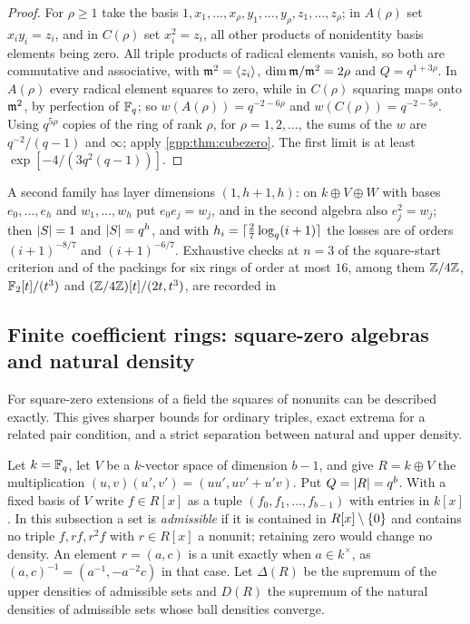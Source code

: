 \begin{proof}
For $\rho\ge1$ take the basis $1,x_1,\dots,x_\rho,y_1,\dots,y_\rho,z_1,\dots,z_\rho$; in
$A(\rho)$ set $x_iy_i=z_i$, and in $C(\rho)$ set $x_i^2=z_i$, all other products of
nonidentity basis elements being zero. All triple products of radical elements vanish, so
both are commutative and associative, with $\mathfrak{m}^2=\langle z_i\rangle$,
$\dim\mathfrak{m}/\mathfrak{m}^2=2\rho$ and $Q=q^{1+3\rho}$. In $A(\rho)$ every radical element squares to
zero, while in $C(\rho)$ squaring maps onto $\mathfrak{m}^2$, by perfection of $\mathbb{F}_q$; so
$w(A(\rho))=q^{-2-6\rho}$ and $w(C(\rho))=q^{-2-5\rho}$. Using $q^{5\rho}$ copies of the
ring of rank $\rho$, for $\rho=1,2,\dots$, the sums of the $w$ are $q^{-2}/(q-1)$ and
$\infty$; apply \cref{gpp:thm:cubezero}. The first limit is at least
$\exp[-4/(3q^2(q-1))]$.
\end{proof}

A second family has layer dimensions $(1,h+1,h)$: on $k\oplus V\oplus W$ with bases
$e_0,\dots,e_h$ and $w_1,\dots,w_h$ put $e_0e_j=w_j$, and in the second algebra also
$e_j^2=w_j$; then $\lvert S\rvert=1$ and $\lvert S\rvert=q^h$, and with $h_i=\lceil\tfrac27\log_q(i+1)\rceil$ the
losses are of orders $(i+1)^{-8/7}$ and $(i+1)^{-6/7}$. Exhaustive checks at $n=3$ of the
square-start criterion and of the packings for six rings of order at most $16$, among them
$\mathbb{Z}/4\mathbb{Z}$, $\mathbb{F}_2[t]/(t^3)$ and $(\mathbb{Z}/4\mathbb{Z})[t]/(2t,t^3)$, are recorded in

\subsection{Finite coefficient rings: square-zero algebras and natural density}\label{gpp:sec:squarezero}
{\raggedright{}}

For square-zero extensions of a field the squares of nonunits can be described exactly.
This gives sharper bounds for ordinary triples, exact extrema for a related pair
condition, and a strict separation between natural and upper density.

Let $k=\mathbb{F}_q$, let $V$ be a $k$-vector space of dimension $b-1$, and give $R=k\oplus V$ the
multiplication $(u,v)(u',v')=(uu',uv'+u'v)$. Put $Q=\lvert R\rvert=q^b$. With a fixed basis of
$V$ write $f\in R[x]$ as a tuple $(f_0,f_1,\ldots,f_{b-1})$ with entries in $k[x]$. In
this subsection a set is \emph{admissible} if it is contained in $R[x]\setminus\{0\}$
and contains no triple $f,rf,r^2f$ with $r\in R[x]$ a nonunit; retaining zero would
change no density. An element $r=(a,c)$ is a unit exactly when $a\in k^\times$, as
$(a,c)^{-1}=(a^{-1},-a^{-2}c)$ in that case. Let $\Delta(R)$ be the supremum of the upper
densities of admissible sets and $D(R)$ the supremum of the natural densities of
admissible sets whose ball densities converge.

